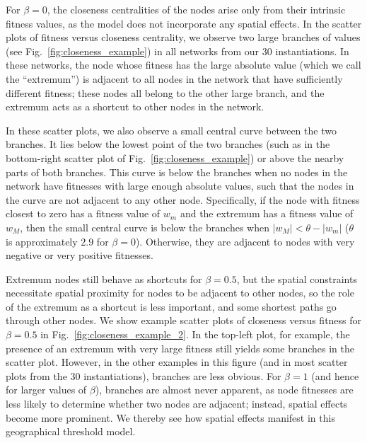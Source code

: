 \documentclass[%
 reprint,
 amsmath,amssymb,
 aps,
]{revtex4-1}
\begin{document}
For $\beta = 0$, the closeness centralities of the nodes arise only from their intrinsic fitness values, as the model does not incorporate any spatial effects.
In the scatter plots of fitness versus closeness centrality, we observe two large branches of values (see Fig.~\ref{fig:closeness_example}) in all networks from our $30$ instantiations. In these networks, the node whose fitness has the large absolute value (which we call the ``extremum'') is adjacent to all nodes in the network that have sufficiently different fitness; these nodes all belong to the other large branch, and the extremum acts as a shortcut to other nodes in the network.

In these scatter plots, we also observe a small central curve between the two branches. It lies below the lowest point of the two branches (such as in the bottom-right scatter plot of Fig.~\ref{fig:closeness_example}) or above the nearby parts of both branches. This curve is below the branches when no nodes in the network have fitnesses with large enough absolute values, such that the nodes in the curve are not adjacent to any other node. {\color{red}Specifically, if the node with fitness closest to zero has a fitness value of $w_m$ and the extremum has a fitness value of $w_M$, then the small central curve is below the branches when $|w_M| < \theta - |w_m|$ ($\theta$ is approximately $2.9$ for $\beta = 0$).}
Otherwise, they are adjacent to nodes with 
very negative or very positive fitnesses. 

Extremum nodes still behave as shortcuts for $\beta = 0.5$, but the spatial constraints necessitate spatial proximity for nodes to be adjacent to other nodes, so the role of the extremum as a shortcut is less important, and some shortest paths go through other nodes. 
We show example scatter plots of closeness versus fitness for $\beta = 0.5$ in Fig.~\ref{fig:closeness_example_2}. In the top-left plot, for example, {\color{red}the presence of an extremum with very large fitness} still yields some branches in the scatter plot. However, in the other examples in this figure (and in most scatter plots from the $30$ instantiations), branches are less obvious. For $\beta = 1$ (and hence for larger values of $\beta$), branches are almost never apparent, as node fitnesses are less likely to determine whether two nodes are adjacent; instead, spatial effects become more prominent. We thereby see how spatial effects manifest in this geographical threshold model.
 
\end{document}
